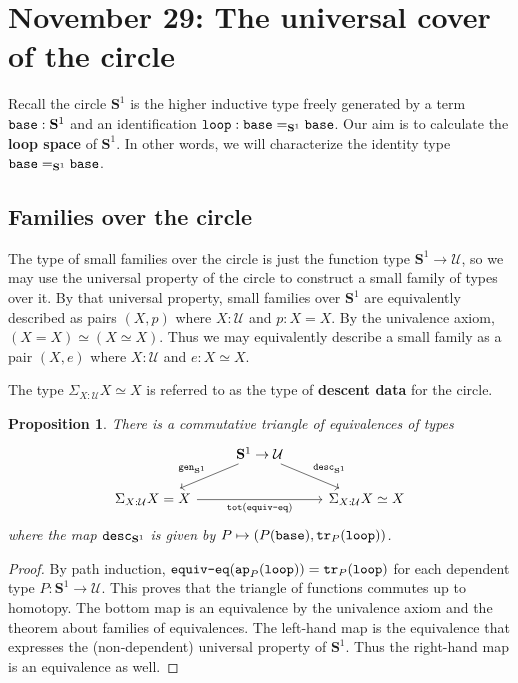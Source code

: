 \documentclass{amsart}
\theoremstyle{theorem}
\newtheorem*{prop}{Proposition}
\theoremstyle{definition}
\theoremstyle{remark}
\newcommand{\0}{\mathbbe{0}}
\newcommand{\1}{\mathbbe{1}}
\newcommand{\2}{\mathbbe{2}}
\newcommand{\3}{\mathbbe{3}}
\newcommand{\4}{\mathbbe{4}}
\newcommand{\term}[1]{{\textup{\texttt{#1}}}}
\newcommand{\tr}{\term{tr}}
\newcommand{\UU}{{\mathcal{U}}}
\newcommand{\Sone}{\mathbf{S}^1}
\newcommand{\base}{\term{base}}
\newcommand{\lloop}{\term{loop}}
\begin{document}
\section*{November 29: The universal cover of the circle}

Recall the circle $\Sone$ is the higher inductive type freely generated by a term $\base : \Sone$ and an identification $\lloop : \base =_{\Sone} \base$. Our aim is to calculate the \textbf{loop space} of $\Sone$. In other words, we will characterize the identity type $\base =_{\Sone} \base$.

\subsection*{Families over the circle}

The type of small families over the circle is just the function type $\Sone \to \UU$, so we may use the universal property of the circle to construct a small family of types over it. By that universal property, small families over $\Sone$ are equivalently described as pairs $(X,p)$ where $X: \UU$ and $p : X =X$. By the univalence axiom, $(X = X) \simeq (X \simeq X)$. Thus we may equivalently describe a small family as a pair $(X,e)$ where $X : \UU$ and $e : X\simeq X$.

The type $\Sigma_{X : \UU} X \simeq X$ is referred to as the type of \textbf{descent data} for the circle.

\begin{prop}
There is a commutative triangle of equivalences of types
\[
\begin{tikzcd} & \Sone \to \UU \arrow[dl, "\term{gen}_{\Sone}"'] \arrow[dr, "\term{desc}_{\Sone}"] \\
 \Sigma_{X: \UU} X =X  \arrow[rr, "\term{tot}(\term{equiv-eq})"'] & &  \Sigma_{X : \UU} X \simeq X
 \end{tikzcd}
 \]
 where the map $\term{desc}_{\Sone}$ is given by $P \mapsto (P(\base), \tr_P(\lloop))$.
 \end{prop}
 \begin{proof}
 By path induction, $\term{equiv-eq}(\term{ap}_P(\lloop)) = \tr_P(\lloop)$ for each dependent type $P : \Sone \to \UU$. This proves that the triangle of functions commutes up to homotopy. The bottom map is an equivalence by the univalence axiom and the theorem about families of equivalences. The left-hand map is the equivalence that expresses the (non-dependent) universal property of $\Sone$. Thus the right-hand map is an equivalence as well.
 \end{proof}
 
\end{document}
